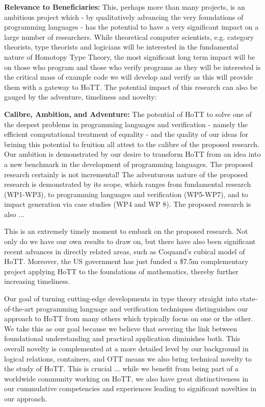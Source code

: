 \documentclass[a4paper,11pt]{article}
\begin{document}
\vspace*{-0.1in}


{\bf Relevance to Beneficiaries:} This, perhaps more than many
projects, is an ambitious project which - by qualitatively advancing
the very foundations of programming languages - has the potential to
have a very significant impact on a large number of researchers. While
theoretical computer scientists, e.g. category theorists, type
theorists and logicians will be interested in the fundamental nature
of Homotopy Type Theory, the most significant long term impact will be
on those who program and those who verify programs as they will be
interested is the critical mass of example code we will develop and
verify as this will provide them with a gateway to HoTT. The potential
impact of this research can also be gauged by the adventure,
timeliness and novelty:

{\bf Calibre, Ambition, and Adventure:} The potential of HoTT to solve
one of the deepest problems in programming languages and verification
- namely the efficient computational treatment of equality - and the
quality of our ideas for brining this potential to fruition all attest
to the calibre of the proposed research. Our ambition is demonstrated
by our desire to transform HoTT from an idea into a new
benchmark in the development of programming languages. The proposed
research certainly is not incremental! The adventurous nature of the
proposed research is demonstrated by its scope, which ranges from
fundamental research (WP1-WP3), to programming languages and
verification (WP5-WP7), and to impact generation via case studies (WP4 and
WP 8). The proposed research is also ...

 This is an extremely timely moment to
embark on the proposed research. Not only do we have our own results
to draw on, but there have also been significant recent advances in
directly related areas, such as Coquand's cubical model of HoTT.
Moreover, the US government has just funded a \$7.5m complementary
project applying HoTT to the foundations of mathematics, thereby
further increasing timeliness.

Our goal of turning cutting-edge developments in type theory straight
into state-of-the-art programming language and verification techniques
distinguishes our approach to HoTT from many others which typically
focus on one or the other. We take this as our goal because we believe
that severing the link between foundational understanding and
practical application diminishes both. This overall novelty is
complemented at a more detailed level by our background in logical
relations, containers, and OTT means we also bring technical novelty
to the study of HoTT. This is crucial ... while we benefit from being
part of a worldwide community working on HoTT, we also have great
distinctiveness in our cummulative competencies and experiences leading to 
significant novelties in our approach.
 
\end{document}
